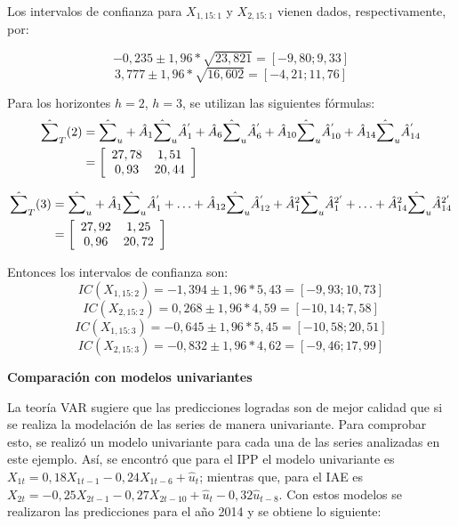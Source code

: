 \begin{enumerate}
Los intervalos de confianza para $X_{1,15:1}$ y $X_{2,15:1}$ vienen dados, respectivamente, por:

\[
-0,235\pm 1,96\ast \sqrt {23,821} =\left[ -9,80;9,33 \right]
\]
\[
3,777\pm 1,96\ast \sqrt {16,602} =\left[ -4,21;11,76 \right]
\]

Para los horizontes $h=2$, $h=3$, se utilizan las siguientes f\'{o}rmulas:
\begin{align*}
\hat{\sum}_{T}(2) &= \hat{\sum}_{u}+\hat{A}_{1}\hat{\sum}_{u}\hat{A}_{1}^{'}+\hat{A}_{6}\hat{\sum }_{u}\hat{A}_{6}^{'}+\hat{A}_{10}\hat{\sum}_{u}\hat{A}_{10}^{'}+\hat{A}_{14}\hat{\sum }_{u}\hat{A}_{14}^{'}\\
                  &= \left[ 
{\begin{array}{*{20}c}
27,78 & 1,51\\
0,93 & 20,44\\
\end{array} } \right]
\end{align*}

\begin{align*}
\hat{\sum}_{T}(3) &= \hat{\sum }_{u}+\hat{A}_{1}\hat{\sum}_{u}\hat{A}_{1}^{'}+\mathellipsis +\hat{A}_{12}\hat{\sum}_{u}\hat{A}_{12}^{'}+\hat{A}_{1}^{2}\hat{\sum}_{u}\hat{A}_{1}^{2'}+\mathellipsis +\hat{A}_{14}^{2}\hat{\sum}_{u}\hat{A}_{14}^{2'}\\
                  &= \left[ 
{\begin{array}{*{20}c}
27,92 & 1,25\\
0,96 & 20,72\\
\end{array} } \right]
\end{align*}

Entonces los intervalos de confianza son:
\[
IC\left( X_{1,15:2} \right)=-1,394\pm 1,96\ast 5,43=\left[ -9,93 ; 10,73 \right]
\]
\[
IC\left( X_{2,15:2} \right)=0,268\pm 1,96\ast 4,59=\left[ -10,14 ; 7,58 \right]
\]
\[
IC\left( X_{1,15:3} \right)=-0,645\pm 1,96\ast 5,45=\left[ -10,58 ; 20,51 \right]
\]
\[
IC\left( X_{2,15:3} \right)=-0,832\pm 1,96\ast 4,62=\left[ -9,46 ; 17,99 \right]
\]

\textbf{Comparaci\'{o}n con modelos univariantes}\newline

La teor\'{i}a VAR sugiere que las predicciones logradas son de mejor calidad que si se realiza la modelaci\'{o}n de las series de manera univariante. Para comprobar esto, se realiz\'{o} un modelo univariante para cada una de las series analizadas en este ejemplo. As\'{i}, se encontr\'{o} que para el IPP el modelo univariante es $X_{1t}=0,18X_{1t-1}-0,24X_{1t-6}+\hat{u}_{t}$; mientras que, para el IAE es $X_{2t}=-0,25X_{2t-1}-0,27X_{2t-10}+\hat{u}_{t}-0,32\hat{u}_{t-8}$. Con estos modelos se realizaron las predicciones para el a\~{n}o 2014 y se obtiene lo siguiente: 


\end{enumerate}
